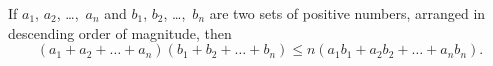 If $a_{1}$, $a_{2}$, \dots,~$a_{n}$ and $b_{1}$, $b_{2}$, \dots,~$b_{n}$ are two sets of positive numbers,
arranged in descending order of magnitude, then
\[
(a_{1} + a_{2} + \dots + a_{n})
(b_{1} + b_{2} + \dots + b_{n})
  \leq n(a_{1}b_{1} + a_{2}b_{2} + \dots + a_{n}b_{n}).
\]
